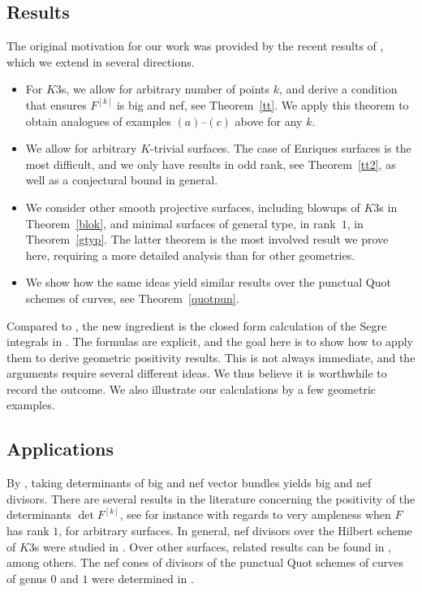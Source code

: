 \documentclass[pdftex]{sigma}
\numberwithin{equation}{section}
\begin{document}
\subsection{Results} The original motivation for our work was provided by the recent results of \cite{BBF}, which we extend in several directions.
\begin{itemize}\itemsep=0pt
\item [$(i)$] For $K3$s, we allow for arbitrary number of points $k$, and derive a condition that ensures $F^{[k]}$ is big and nef, see Theorem~\ref{tt}. We apply this theorem to obtain analogues of examples $(a)$--$(c)$ above for any $k$.
\item [$(ii)$] We allow for arbitrary $K$-trivial surfaces. The case of Enriques surfaces is the most difficult, and we only have results in odd rank, see Theorem~\ref{tt2}, as well as a conjectural bound in general.
\item [$(iii)$] We consider other smooth projective surfaces, including blowups of $K3$s in Theorem~\ref{blok}, and minimal surfaces of general type, in rank~$1$, in Theorem~\ref{gtyp}. The latter theorem is the most involved result we prove here, requiring a more detailed analysis than for other geometries.
\item [$(iv)$] We show how the same ideas yield similar results over the punctual Quot schemes of curves, see Theorem~\ref{quotpun}.
\end{itemize}

Compared to \cite{BBF}, the new ingredient is the closed form calculation of the Segre integrals in \cite{MOP2, MOP1, MOP, OP2021}. The formulas are explicit, and the goal here is to show how to apply them to derive geometric positivity results. This is not always immediate, and the arguments require several different ideas. We thus believe it is worthwhile to record the outcome. We also illustrate our calculations by a few geometric examples.

\subsection{Applications} By \cite[Proposition 1.4]{Y}, taking determinants of big and nef vector bundles yields big and nef divisors. There are several results in the literature concerning the positivity of the determinants $\det F^{[k]}$, see for instance \cite{BS, CG} with regards to very ampleness when $F$ has rank $1$, for arbitrary surfaces. In general, nef divisors over the Hilbert scheme of $K3$s were studied in \cite[Section~10]{BM}. Over other surfaces, related results can be found in \cite{ABCH, BC, BHL+, Ko, LQZ, MM, N, QT, YY}, among others. The nef cones of divisors of the punctual Quot schemes of curves of genus $0$ and $1$ were determined in \cite{GS, St}.
\end{document}
